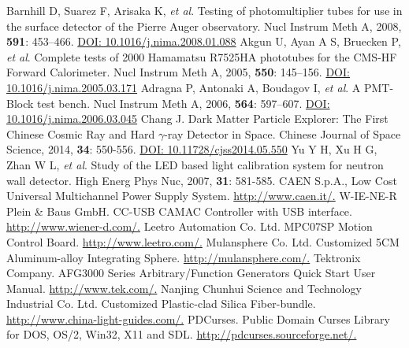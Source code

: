\documentclass{nst}
\begin{document}
\begin{thebibliography}{99}
	 Barnhill D, Suarez F, Arisaka K, \emph{et al}. Testing of photomultiplier tubes for use in the surface detector of the {Pierre} {Auger} observatory. Nucl Instrum Meth A, 2008, {\bf 591}: 453--466.
	\href{http://dx.doi.org/10.1016/j.nima.2008.01.088}{DOI: 10.1016/j.nima.2008.01.088}
	 Akgun U, Ayan A S, Bruecken P, \emph{et al}. Complete tests of 2000 {Hamamatsu} {R}7525HA phototubes for the {CMS}-{HF} {Forward} {Calorimeter}. Nucl Instrum Meth A, 2005, {\bf 550}: 145--156.
	\href{http://dx.doi.org/10.1016/j.nima.2005.03.171}{DOI: 10.1016/j.nima.2005.03.171}
	 Adragna P, Antonaki A, Boudagov I, \emph{et al}. A {PMT}-{Block} test bench. Nucl Instrum Meth A, 2006, {\bf 564}: 597--607.
	\href{http://dx.doi.org/10.1016/j.nima.2006.03.045}{DOI: 10.1016/j.nima.2006.03.045}
	 Chang J. Dark Matter Particle Explorer: The First Chinese Cosmic Ray and Hard $\gamma$-ray Detector in Space. Chinese Journal of Space Science, 2014, {\bf 34}: 550-556.
	\href{http://dx.doi.org/10.11728/cjss2014.05.550}{DOI: 10.11728/cjss2014.05.550}
	 Yu Y H, Xu H G, Zhan W L, \emph{et al}. Study of the LED based light calibration system for neutron wall detector. High Energ Phys Nuc, 2007, {\bf 31}: 581-585.
	 {CAEN S.p.A.}, Low Cost Universal Multichannel Power Supply System. \href{http://www.caen.it/csite/CaenProd.jsp?idmod=491&parent=20}{http://www.caen.it/.}
	 {W-IE-NE-R Plein \& Baus GmbH.} {CC-USB CAMAC Controller with USB interface}. \href{http://www.wiener-d.com/sc/modules/camac--modules/cc-usb.html}{http://www.wiener-d.com/.}
	 {Leetro Automation Co. Ltd.} {MPC07SP Motion Control Board}. \href{http://www.leetro.com/english/}{http://www.leetro.com/.}
	 {Mulansphere Co. Ltd.} {Customized 5CM Aluminum-alloy Integrating Sphere}. \href{http://mulansphere.com/e-index.html/}{http://mulansphere.com/.}
	 {Tektronix Company}. {AFG3000 Series Arbitrary/Function Generators Quick Start User Manual}. \href{http://www.tek.com/signal-generator/afg3000-function-generator/}{http://www.tek.com/.}
	 Nanjing Chunhui Science and Technology Industrial Co. Ltd. Customized Plastic-clad Silica Fiber-bundle.  \href{http://www.china-light-guides.com/}{http://www.china-light-guides.com/.}
	 PDCurses.  Public Domain Curses Library for DOS, OS/2, Win32, X11 and SDL. \href{http://pdcurses.sourceforge.net/}{http://pdcurses.sourceforge.net/.}

\end{thebibliography}
\end{document}
